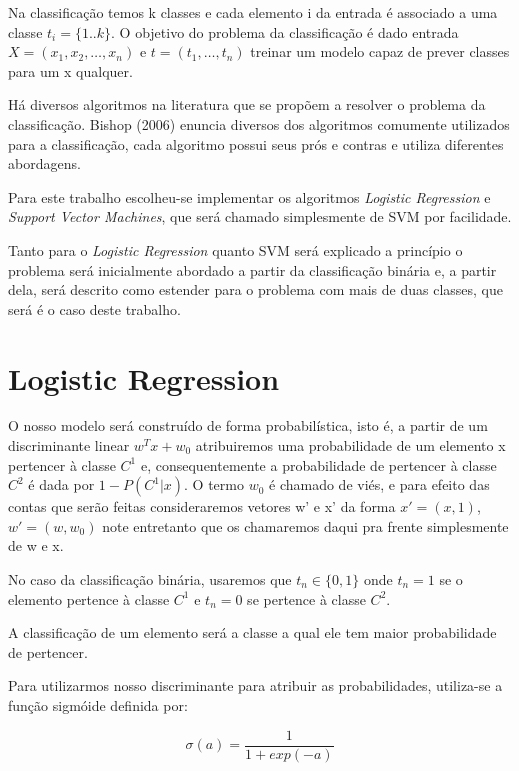 Na classificação temos k classes e cada elemento i da entrada é associado a uma classe $t_i = \{1..k\}$.
O objetivo do problema da classificação é dado entrada $X = (x_1, x_2, \ldots, x_n)$ 
e $t = (t_1, \ldots, t_n)$ treinar um modelo capaz de prever classes para um x qualquer.

Há diversos algoritmos na literatura que se propõem a resolver o problema da classificação.
Bishop (2006)\cite{bishop2006} enuncia diversos dos algoritmos comumente utilizados para a
classificação, cada algoritmo possui seus prós e contras e utiliza diferentes abordagens.

Para este trabalho escolheu-se implementar os algoritmos \textit{Logistic Regression} e
\textit{Support Vector Machines}, que será chamado simplesmente de SVM por facilidade.

Tanto para o \textit{Logistic Regression} quanto SVM será explicado a princípio o problema
será inicialmente abordado a partir da classificação binária e, a partir dela, será descrito
como estender para o problema com mais de duas classes, que será é o caso deste trabalho.

\section{Logistic Regression}
\label{sec:logreg} 

O nosso modelo será construído de forma probabilística, isto é, a partir de um 
discriminante linear $w^Tx + w_0$ atribuiremos uma probabilidade de um elemento x
pertencer à classe $C^1$ e, consequentemente a probabilidade de pertencer à classe
$C^2$ é dada por $1 - P(C^1 | x)$. O termo $w_0$ é chamado de viés, e para efeito
das contas que serão feitas consideraremos vetores w' e x' da forma $x' = (x, 1)$,
$w'= (w, w_0)$ note entretanto que os chamaremos daqui pra frente simplesmente de w e x.

No caso da classificação binária, usaremos que $t_n \in \{0, 1\}$ onde $t_n = 1$ se o
elemento pertence à classe $C^1$ e $t_n = 0$ se pertence à classe $C^2$.

A classificação de um elemento será a classe a qual ele tem maior probabilidade de pertencer.

Para utilizarmos nosso discriminante para atribuir as probabilidades, utiliza-se a função
sigmóide definida por:

\begin{center}
	\begin{equation}
		\sigma(a) = \frac{1}{1 + exp(-a)}
	\end{equation}
\end{center}


